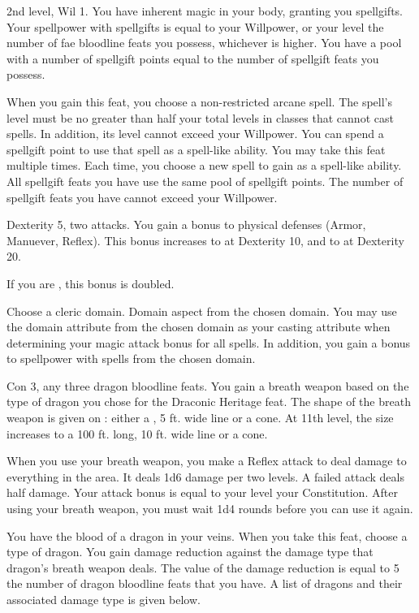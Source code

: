 \featpres 2nd level, Wil 1.
\featben You have inherent magic in your body, granting you spellgifts.
Your spellpower with spellgifts is equal to your Willpower, or your level \add the number of fae bloodline feats you possess, whichever is higher.
You have a pool with a number of spellgift points equal to the number of spellgift feats you possess.

When you gain this feat, you choose a non-restricted arcane spell.
The spell's level must be no greater than half your total levels in classes that cannot cast spells.
In addition, its level cannot exceed your Willpower.
You can spend a spellgift point to use that spell as a spell-like ability.
You may take this feat multiple times.
Each time, you choose a new spell to gain as a spell-like ability.
All spellgift feats you have use the same pool of spellgift points.
The number of spellgift feats you have cannot exceed your Willpower.

\featpre Dexterity 5, two attacks.
\featben You gain a  bonus to physical defenses (Armor, Manuever, Reflex).
This bonus increases to  at Dexterity 10, and to  at Dexterity 20.

If you are \unencumbered, this bonus is doubled.

Choose a cleric domain.
\featpre Domain aspect from the chosen domain.
\featben You may use the domain attribute from the chosen domain as your casting attribute when determining your magic attack bonus for all spells.
In addition, you gain a  bonus to spellpower with spells from the chosen domain.

\featpres
Con 3, any three dragon bloodline feats.
\featben You gain a breath weapon based on the type of dragon you chose for the Draconic Heritage feat.
The shape of the breath weapon is given on : either a \arealarge, 5 ft.
wide line or a \areamed cone.
At 11th level, the size increases to a 100 ft.
long, 10 ft.
wide line or a \arealarge cone.

When you use your breath weapon, you make a Reflex attack to deal damage to everything in the area.
It deals 1d6 damage per two levels.
A failed attack deals half damage.
Your attack bonus is equal to your level \add your Constitution.
After using your breath weapon, you must wait 1d4 rounds before you can use it again.

\featben You have the blood of a dragon in your veins.
When you take this feat, choose a type of dragon.
You gain damage reduction against the damage type that dragon's breath weapon deals.
The value of the damage reduction is equal to 5 \mtimes the number of dragon bloodline feats that you have.
A list of dragons and their associated damage type is given below.

